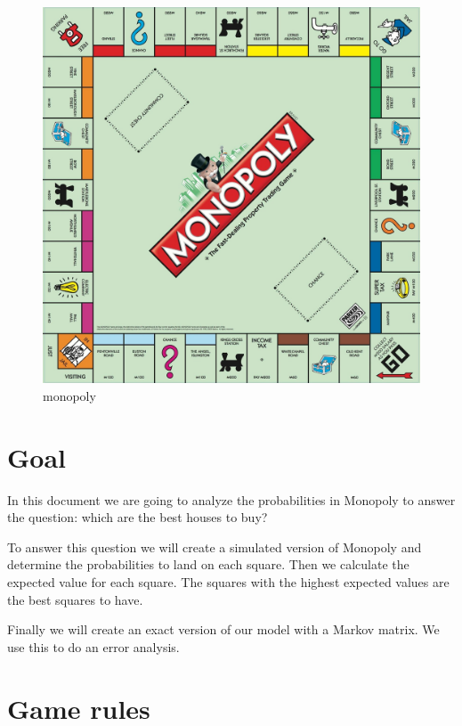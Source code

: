 \documentclass[11pt]{article}
\makeatletter
\def\maxwidth{\ifdim\Gin@nat@width>\linewidth\linewidth
    \else\Gin@nat@width\fi}
\let\Oldincludegraphics\includegraphics
\renewcommand{\includegraphics}[1]{\Oldincludegraphics[width=.8\maxwidth]{#1}}
\makeatother
\begin{document}
	\newpage
	\tableofcontents
	\newpage
    \begin{figure}[H]
\centering
\includegraphics{monopoly_1.jpg}
\caption{monopoly}
\end{figure}

    \hypertarget{goal}{%
\section{Goal}\label{goal}}

    In this document we are going to analyze the probabilities in Monopoly
to answer the question: which are the best houses to buy?

To answer this question we will create a simulated version of Monopoly
and determine the probabilities to land on each square. Then we
calculate the expected value for each square. The squares with the
highest expected values are the best squares to have.

Finally we will create an exact version of our model with a Markov
matrix. We use this to do an error analysis.

    \hypertarget{game-rules}{%
\section{Game rules}\label{game-rules}}
\end{document}
